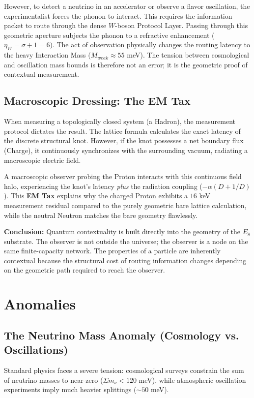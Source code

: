 However, to detect a neutrino in an accelerator or observe a flavor oscillation, the experimentalist forces the phonon to interact. This requires the information packet to route through the dense $W$-boson Protocol Layer. Passing through this geometric aperture subjects the phonon to a refractive enhancement ($\eta_W = \sigma + 1 = 6$). The act of observation physically changes the routing latency to the heavy Interaction Mass ($M_{weak} \approx 55$ meV). The tension between cosmological and oscillation mass bounds is therefore not an error; it is the geometric proof of contextual measurement.

\subsection{Macroscopic Dressing: The EM Tax}
When measuring a topologically closed system (a Hadron), the measurement protocol dictates the result. The lattice formula calculates the exact latency of the discrete structural knot. However, if the knot possesses a net boundary flux (Charge), it continuously synchronizes with the surrounding vacuum, radiating a macroscopic electric field. 

A macroscopic observer probing the Proton interacts with this continuous field halo, experiencing the knot's latency \textit{plus} the radiation coupling ($-\alpha(D+1/D)$). This \textbf{EM Tax} explains why the charged Proton exhibits a $16$ keV measurement residual compared to the purely geometric bare lattice calculation, while the neutral Neutron matches the bare geometry flawlessly.

\vspace{0.5em}
\textbf{Conclusion:} Quantum contextuality is built directly into the geometry of the $E_8$ substrate. The observer is not outside the universe; the observer is a node on the same finite-capacity network. The properties of a particle are inherently contextual because the structural cost of routing information changes depending on the geometric path required to reach the observer.


\section{Anomalies}

\subsection{The Neutrino Mass Anomaly (Cosmology vs. Oscillations)}
Standard physics faces a severe tension: cosmological surveys constrain the sum of neutrino masses to near-zero ($\Sigma m_\nu < 120$ meV), while atmospheric oscillation experiments imply much heavier splittings ($\sim 50$ meV). 

